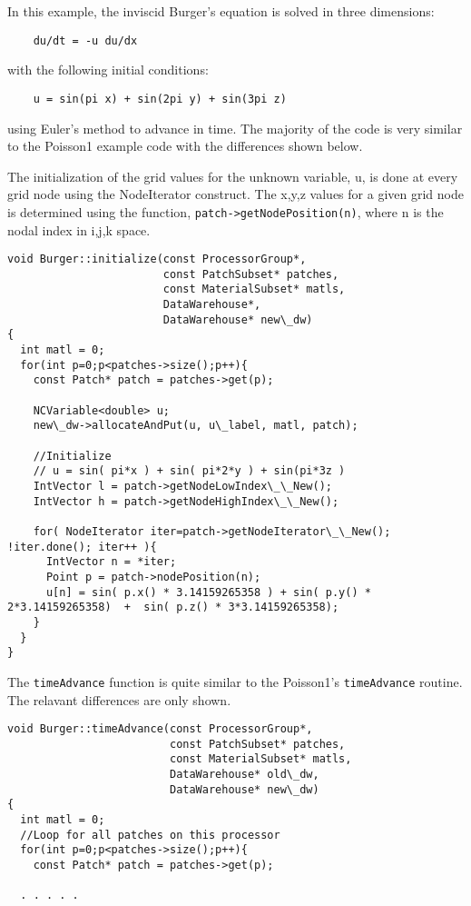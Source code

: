 \documentclass[12pt]{report}
\begin{document}
In this example, the inviscid Burger's equation is solved in three dimensions:
\begin{verbatim}
	du/dt = -u du/dx  
\end{verbatim}

with the following initial conditions:

\begin{verbatim}
	u = sin(pi x) + sin(2pi y) + sin(3pi z)
\end{verbatim}

using Euler's method to advance in time.  The majority of the code is
very similar to the Poisson1 example code with the differences shown
below.

The initialization of the grid values for the unknown variable, u, is
done at every grid node using the NodeIterator construct.  The x,y,z
values for a given grid node is determined using the function,
\texttt{patch->getNodePosition(n)}, where n is the nodal index in
i,j,k space.

\begin{verbatim}
void Burger::initialize(const ProcessorGroup*,
                        const PatchSubset* patches,
                        const MaterialSubset* matls,
                        DataWarehouse*, 
                        DataWarehouse* new\_dw)
{
  int matl = 0;
  for(int p=0;p<patches->size();p++){
    const Patch* patch = patches->get(p);

    NCVariable<double> u;
    new\_dw->allocateAndPut(u, u\_label, matl, patch);

    //Initialize
    // u = sin( pi*x ) + sin( pi*2*y ) + sin(pi*3z )
    IntVector l = patch->getNodeLowIndex\_\_New();
    IntVector h = patch->getNodeHighIndex\_\_New();
    
    for( NodeIterator iter=patch->getNodeIterator\_\_New(); !iter.done(); iter++ ){
      IntVector n = *iter;
      Point p = patch->nodePosition(n);
      u[n] = sin( p.x() * 3.14159265358 ) + sin( p.y() * 2*3.14159265358)  +  sin( p.z() * 3*3.14159265358);
    }
  }
}

\end{verbatim}

The \texttt{timeAdvance} function is quite similar to the Poisson1's
\texttt{timeAdvance} routine.  The relavant differences are only
shown.

\begin{verbatim}
void Burger::timeAdvance(const ProcessorGroup*,
                         const PatchSubset* patches,
                         const MaterialSubset* matls,
                         DataWarehouse* old\_dw, 
                         DataWarehouse* new\_dw)
{
  int matl = 0;
  //Loop for all patches on this processor
  for(int p=0;p<patches->size();p++){
    const Patch* patch = patches->get(p);
    
  . . . . .
\end{verbatim}
\end{document}
